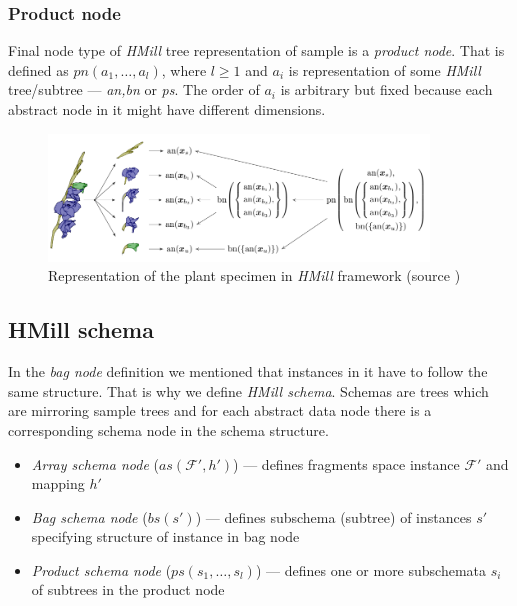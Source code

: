 \subsubsection{Product node}
Final node type of \emph{HMill} tree representation of sample is a \emph{product node}. That is defined as $pn(a_1,\dots,a_{l})$, where $l\geq1$ and $a_i$ is representation of some \emph{HMill} tree/subtree --- \emph{an,bn} or \emph{ps}. The order of $a_i$ is arbitrary but fixed because each abstract node in it might have different dimensions.

\begin{figure}[h]
    \centering
    \includegraphics[width=0.9\textwidth]{figures/irismill.png}
    \caption{Representation of the plant specimen in \emph{HMill} framework (source \cite{Mandlik2020})}
    \label{fig:irismill}
\end{figure}

\subsection{HMill schema}
In the \emph{bag node} definition we mentioned that instances in it have to follow the same structure. That is why we define \emph{HMill schema}. Schemas are trees which are mirroring sample trees and for each abstract data node there is a corresponding schema node in the schema structure. 
\begin{itemize}
    \itemsep0em 
    \item \emph{Array schema node} ($as(\mathcal{F'},h')$) --- defines fragments space instance $\mathcal{F'}$ and mapping $h'$
    \item \emph{Bag schema node} ($bs(s')$) --- defines subschema (subtree) of instances $s'$ specifying structure of instance in bag node
    \item \emph{Product schema node} ($ps(s_1,\dots,s_{l})$) --- defines one or more subschemata $s_i$ of subtrees in the product node
\end{itemize}

